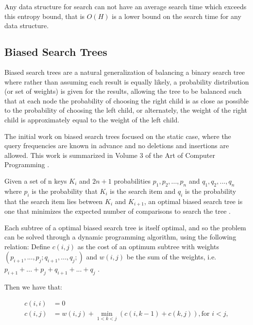 \documentclass[mcs]{scsthesis}
\begin{document}
Any data structure for search can not have an average search time which
exceeds this entropy bound, that is \(O(H)\) is a lower bound on the search time
for any data structure.

\subsection{Biased Search Trees}

Biased search trees are a natural generalization of balancing a binary search
tree where rather than assuming each result is equally likely, a probability
distribution (or set of weights) is given for the results, allowing the tree to
be balanced such that at each node the probability of choosing the right child
is as close as possible to the probability of choosing the left child, or
alternately, the weight of the right child is approximately equal to the weight
of the left child.

The initial work on biased search trees focused on the static case, where
the query frequencies are known in advance and no deletions and insertions
are allowed. This work is summarized in Volume 3 of the Art of Computer
Programming \cite{knuth}.

Given a set of n keys \(K_i\) and \(2n + 1\) probabilities
\(p_1, p_2, ..., p_n\) and \(q_1, q_2, ..., q_n\) where \(p_i\) is the
probability that \(K_i\) is the search item and \(q_i\) is the
probability that the search item lies between \(K_i\) and \(K_{i+1}\), an
optimal biased search tree is one that minimizes the expected number of
comparisons to search the tree \cite{knuth}.

Each subtree of a optimal biased search tree is itself optimal, and so the
problem can be solved through a dynamic programming algorithm, using the
following relation: Define \( c(i,j)\) as the cost of an optimum subtree with
weights \((p_{i+1}, ..., p_j; q_{i+1}, ..., q_j;)\) and \(w(i, j)\) be the
sum of the weights, i.e. \(p_{i+1} + ... + p_j + q_{i + 1} + ... + q_j \)
\cite{knuth}.

Then we have that:

\begin{equation}
    \begin{aligned}
    c(i, i) & = 0 \\
    c(i, j) & = w(i, j) + \min_{1<k<j} (c(i, k - 1) + c(k, j)), \text{for } i<j, \\
    \end{aligned}
\end{equation}
\end{document}
